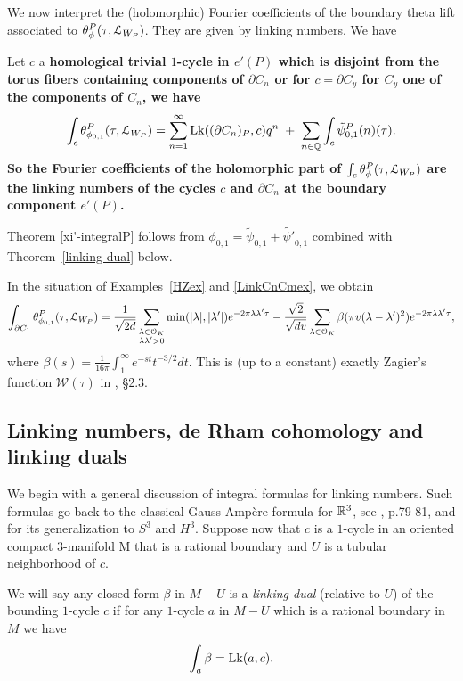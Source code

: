 We now interpret the (holomorphic) Fourier coefficients of the boundary theta lift associated to $ \theta^P_{\phi}(\tau,\mathcal{L}_{W_P})$. They are given by linking numbers. We have


\begin{theorem}\label{xi'-integralP}
Let $c$ a \bf{homological trivial} $1$-cycle in $e'(P)$ which
is disjoint from the torus fibers containing components of $\partial C_n$ or for $c=\partial C_y$ for $C_y$ one of the components of $C_n$, we have
\[
\int_{c} \theta^P_{\phi_{0,1}}(\tau,\mathcal{L}_{W_P}) = 
  \sum_{n=1}^{\infty}  \operatorname{Lk}((\partial C_n)_P,c) q^n
 \; + \; \sum_{n \in \mathbb{Q}} \int_{c}  {\tilde{\psi}_{0,1}^P}(n)(\tau).
\]
 So the Fourier coefficients of the holomorphic part of $\int_{c} \theta^P_{\phi}(\tau,\mathcal{L}_{W_P})$ are the linking numbers of the cycles $c$ and $ \partial C_n$ at the boundary component $e'(P)$.  
 \end{theorem}

Theorem \ref{xi'-integralP} follows from $\phi_{0,1} = \tilde{\psi}_{0,1} + \tilde{\psi'}_{0,1}$ combined with Theorem~\ref{linking-dual} below.  

\begin{example}\label{HZbeta}
In the situation of Examples~\ref{HZex} and \ref{LinkCnCmex}, we obtain
\[
\int_{\partial C_1} \theta^P_{\phi_{0,1}}(\tau,\mathcal{L}_{W_P}) = \frac{1}{\sqrt{2d}} \sum_{\substack{\lambda \in \mathcal{O}_K \\ \lambda\lambda'>0}} \min(|\lambda|,|\lambda'|) e^{-2\pi \lambda \lambda' \tau } - \frac{\sqrt{2}}{\sqrt{dv}} \sum_{\lambda \in \mathcal{O}_K} \beta (\pi v (\lambda-\lambda')^2) e^{-2\pi \lambda \lambda' \tau},
\]
where $\beta(s) = \tfrac1{16\pi} \int_1^{\infty} e^{-st}t^{-3/2} dt$. This is (up to a constant) exactly Zagier's function $\mathcal{W}(\tau)$ in \cite{HZ}, \S 2.3. 


\end{example}

\subsection{Linking numbers, de Rham cohomology and linking duals} \label{generallinking}
We begin with a general discussion of integral formulas for linking numbers.
Such formulas go back to the classical Gauss-Amp\`ere formula for $\mathbb{R}^3$, see \cite{F}, p.79-81, and \cite{DG} for its generalization to $S^3$ and $H^3$. 
Suppose now that $c$ is a $1$-cycle in an oriented compact $3$-manifold M that is a rational boundary and $U$ is a tubular neighborhood of $c$. 
\begin{definition}
We will say any closed form $\beta$ in $M-U$ is a {\it linking dual} (relative to $U$) of the bounding $1$-cycle $c$ if for any $1$-cycle $a$ in $M-U$
which is a rational boundary in $M$ we have
\begin{equation*} \label{linkingdualdef} 
\int_a \beta = \operatorname{Lk}(a,c).
\end{equation*}
\end{definition}

